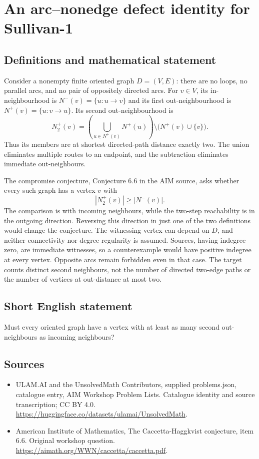\documentclass[11pt,a4paper]{article}
\begin{document}
\section*{An arc--nonedge defect identity for Sullivan-1}\label{statement}

\subsection{Definitions and mathematical statement}
Consider a nonempty finite oriented graph $D=(V,E)$: there are no
loops, no parallel arcs, and no pair of oppositely directed arcs.
For $v\in V$, its in-neighbourhood is $N^-(v)=\{u:u\to v\}$ and
its first out-neighbourhood is $N^+(v)=\{u:v\to u\}$.
Its second out-neighbourhood is
\[
 N_2^+(v)=\left(\bigcup_{u\in N^+(v)}N^+(u)\right)
                         \setminus\bigl(N^+(v)\cup\{v\}\bigr).
\]
Thus its members are at shortest directed-path distance exactly two.
The union eliminates multiple routes to an endpoint, and the
subtraction eliminates immediate out-neighbours.

The compromise conjecture, Conjecture 6.6 in the AIM source, asks
whether every such graph has a vertex $v$ with
\[
                              |N_2^+(v)|\ge |N^-(v)|.
\]
The comparison is with incoming neighbours, while the two-step
reachability is in the outgoing direction. Reversing this direction
in just one of the two definitions would change the conjecture.
The witnessing vertex can depend on $D$, and neither connectivity
nor degree regularity is assumed. Sources, having indegree zero,
are immediate witnesses, so a counterexample would have positive
indegree at every vertex. Opposite arcs remain forbidden even in
that case. The target counts distinct second neighbours, not the
number of directed two-edge paths or the number of vertices at
out-distance at most two.
\subsection{Short English statement}
Must every oriented graph have a vertex with at least as many second out-neighbours as incoming neighbours?
\subsection{Sources}
\begin{itemize}
\item[S1] ULAM.AI and the UnsolvedMath Contributors, supplied problems.json, catalogue entry, AIM Workshop Problem Lists. Catalogue identity and source transcription; CC BY 4.0.
\url{https://huggingface.co/datasets/ulamai/UnsolvedMath}.
\item[S2] American Institute of Mathematics, The Caccetta-Haggkvist conjecture, item 6.6. Original workshop question.
\url{https://aimath.org/WWN/caccetta/caccetta.pdf}.
\end{itemize}
\end{document}

